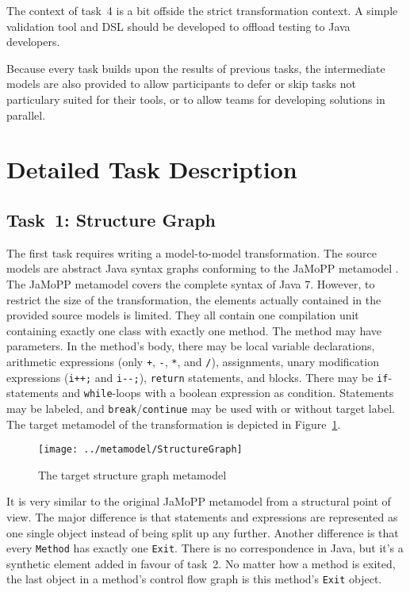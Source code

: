 \documentclass[submission]{eptcs}
\begin{document}
The context of task~4 is a bit offside the strict transformation context.  A
simple validation tool and DSL should be developed to offload testing to Java
developers.

Because every task builds upon the results of previous tasks, the intermediate
models are also provided to allow participants to defer or skip tasks not
particulary suited for their tools, or to allow teams for developing solutions
in parallel.

\section{Detailed Task Description}
\label{sec:task-descr}

\subsection*{Task~1: Structure Graph}
\label{sec:task1-structure-graph}

The first task requires writing a model-to-model transformation.  The source
models are abstract Java syntax graphs conforming to the JaMoPP metamodel
\cite{jamopp09}.  The JaMoPP metamodel covers the complete syntax of Java 7.
However, to restrict the size of the transformation, the elements actually
contained in the provided source models is limited.  They all contain one
compilation unit containing exactly one class with exactly one method.  The
method may have parameters.  In the method's body, there may be local variable
declarations, arithmetic expressions (only \verb|+|, \verb|-|, \verb|*|, and
\verb|/|), assignments, unary modification expressions (\verb|i++;| and
\verb|i--;|), \verb|return| statements, and blocks.  There may be
\verb|if|-statements and \verb|while|-loops with a boolean expression as
condition.  Statements may be labeled, and \verb|break|/\verb|continue| may be
used with or without target label.  The target metamodel of the transformation
is depicted in Figure~\ref{fig:structure-graph-mm}.

\begin{figure}[h!]
  \centering
  \texttt{[image: ../metamodel/StructureGraph]}
  \caption{The target structure graph metamodel}
  \label{fig:structure-graph-mm}
\end{figure}

It is very similar to the original JaMoPP metamodel from a structural point of
view.  The major difference is that statements and expressions are represented
as one single object instead of being split up any further.  Another difference
is that every \verb|Method| has exactly one \verb|Exit|.  There is no
correspondence in Java, but it's a synthetic element added in favour of task~2.
No matter how a method is exited, the last object in a method's control flow
graph is this method's \verb|Exit| object.
\end{document}
